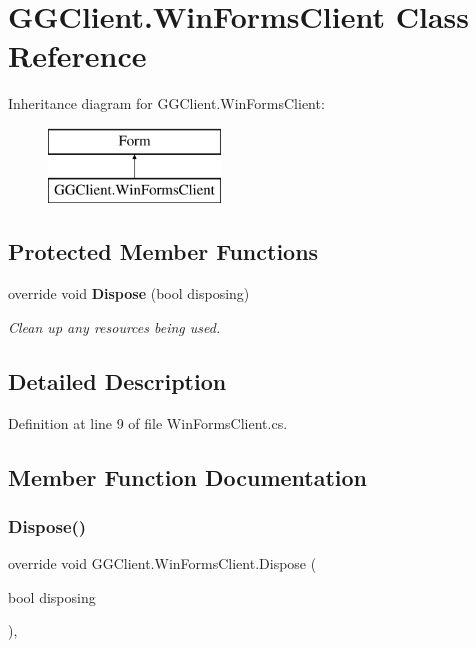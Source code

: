 \section{G\+G\+Client.\+Win\+Forms\+Client Class Reference}
\label{class_g_g_client_1_1_win_forms_client}
Inheritance diagram for G\+G\+Client.\+Win\+Forms\+Client\+:\begin{figure}[H]
\begin{center}
\leavevmode
\includegraphics[height=2.000000cm]{class_g_g_client_1_1_win_forms_client}
\end{center}
\end{figure}
\subsection*{Protected Member Functions}
\begin{DoxyCompactItemize}
\item 
override void \textbf{ Dispose} (bool disposing)
\begin{DoxyCompactList}\small\item\em Clean up any resources being used. \end{DoxyCompactList}\end{DoxyCompactItemize}


\subsection{Detailed Description}


Definition at line 9 of file Win\+Forms\+Client.\+cs.



\subsection{Member Function Documentation}
\mbox{\label{class_g_g_client_1_1_win_forms_client_a5e99ab1d8838b0419f6f0e22a91cedda}} 
\subsubsection{Dispose()}
{\footnotesize\ttfamily override void G\+G\+Client.\+Win\+Forms\+Client.\+Dispose (\begin{DoxyParamCaption}\item[{bool}]{disposing }\end{DoxyParamCaption})\hspace{0.3cm}{\ttfamily [inline]}, {\ttfamily [protected]}}



